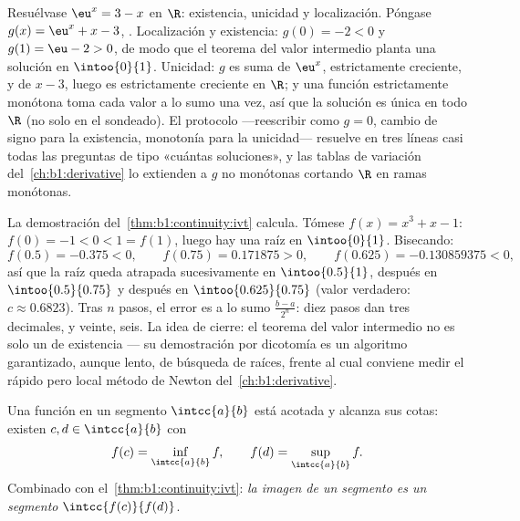\begin{example}\label{ex:b1:continuity:protocol}
Resuélvase $\eu^x = 3 - x$ en $\R$: existencia, unicidad y
localización. Póngase $g(x) = \eu^x + x - 3$, . Localización
y existencia: $g(0) = -2 < 0$ y $g(1) = \eu - 2 > 0$, de modo que el
teorema del valor intermedio planta una solución en $\intoo{0}{1}$.
Unicidad: $g$ es suma de $\eu^x$, estrictamente creciente, y de
$x - 3$, luego es estrictamente creciente en $\R$; y una función
estrictamente monótona toma cada valor a lo sumo una vez, así que la
solución es única en todo $\R$ (no solo en el  sondeado). El
protocolo ---reescribir como $g = 0$, cambio de signo para la
existencia, monotonía para la unicidad--- resuelve en tres líneas casi
todas las preguntas de tipo «cuántas soluciones», y las tablas de
variación del~\cref{ch:b1:derivative} lo extienden a $g$ no monótonas
cortando $\R$ en ramas monótonas.
\end{example}

\begin{example}\label{ex:b1:continuity:dichotomy}
La demostración del~\cref{thm:b1:continuity:ivt} calcula. Tómese
$f(x) = x^3 + x - 1$: $f(0) = -1 < 0 < 1 = f(1)$, luego hay una raíz
en $\intoo{0}{1}$. Bisecando:
\[
f(0.5) = -0.375 < 0, \qquad
f(0.75) = 0.171875 > 0, \qquad
f(0.625) = -0.130859375 < 0 ,
\]
así que la raíz queda atrapada sucesivamente en $\intoo{0.5}{1}$,
después en $\intoo{0.5}{0.75}$ y después en $\intoo{0.625}{0.75}$
(valor verdadero: $c \approx 0.6823$). Tras $n$ pasos, el error es a
lo sumo $\frac{b - a}{2^n}$: diez pasos dan tres decimales, y veinte,
seis. La idea de cierre: el teorema del valor intermedio no es solo un
 de existencia --- su demostración por dicotomía es un
algoritmo garantizado, aunque lento, de búsqueda de raíces, frente al
cual conviene medir el rápido pero local método de Newton
del~\cref{ch:b1:derivative}.
\end{example}

\begin{theorem}\label{thm:b1:continuity:evt}
Una función  en un segmento $\intcc{a}{b}$ está acotada y
alcanza sus cotas: existen $c, d \in \intcc{a}{b}$ con
\[
f(c) = \inf_{\intcc{a}{b}} f,
\qquad
f(d) = \sup_{\intcc{a}{b}} f .
\]
Combinado con el~\cref{thm:b1:continuity:ivt}: \emph{la imagen
 de un segmento es un segmento} $\intcc{f(c)}{f(d)}$.
\end{theorem}

